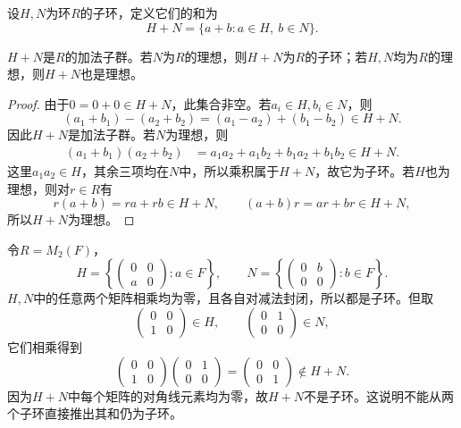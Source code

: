 \begin{definition}
设$H,N$为环$R$的子环，定义它们的和为
\[
H+N=\{a+b:a\in H,\ b\in N\}.
\]
\end{definition}
\begin{proposition}
	$H+N $是$R$的加法子群。若$N$为$R$的理想，则$H+N$为$R$的子环；若$H,N$均为$R$的理想，则$H+N$也是理想。
\end{proposition}
\begin{proof}
	由于$0=0+0\in H+N$，此集合非空。若$a_i\in H,b_i\in N$，则
\[
(a_1+b_1)-(a_2+b_2)=(a_1-a_2)+(b_1-b_2)\in H+N.
\]
因此$H+N$是加法子群。若$N$为理想，则
	\begin{align*}
		(a_1+b_1)(a_2+b_2)
		&=a_1a_2+a_1b_2+b_1a_2+b_1b_2\in H+N.
	\end{align*}
	这里$a_1a_2\in H$，其余三项均在$N$中，所以乘积属于$H+N$，故它为子环。若$H$也为理想，则对$r\in R$有
	\[
	r(a+b)=ra+rb\in H+N,\qquad (a+b)r=ar+br\in H+N,
	\]
	所以$H+N$为理想。
\end{proof}
\begin{example}
令$R=M_2(F)$，
\[
H=\left\{\begin{pmatrix}0&0\\a&0\end{pmatrix}:a\in F\right\},\qquad
N=\left\{\begin{pmatrix}0&b\\0&0\end{pmatrix}:b\in F\right\}.
\]
$H,N$中的任意两个矩阵相乘均为零，且各自对减法封闭，所以都是子环。但取
\[
\begin{pmatrix}0&0\\1&0\end{pmatrix}\in H,\qquad
\begin{pmatrix}0&1\\0&0\end{pmatrix}\in N,
\]
它们相乘得到
\[
\begin{pmatrix}0&0\\1&0\end{pmatrix}
\begin{pmatrix}0&1\\0&0\end{pmatrix}
=\begin{pmatrix}0&0\\0&1\end{pmatrix}\notin H+N.
\]
因为$H+N$中每个矩阵的对角线元素均为零，故$H+N$不是子环。这说明不能从两个子环直接推出其和仍为子环。
\end{example}


